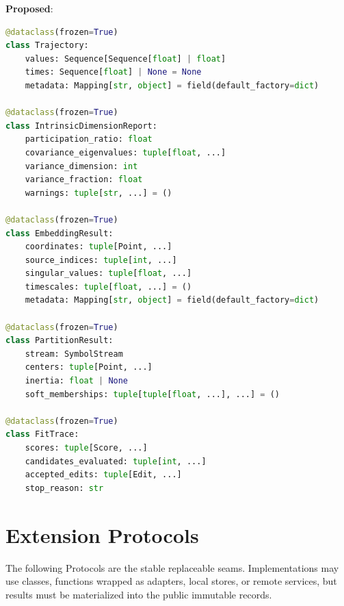 \documentclass[11pt]{article}
\newcommand{\Proposed}{\textbf{Proposed}}
\begin{document}
\Proposed:
\begin{lstlisting}[language=Python]
@dataclass(frozen=True)
class Trajectory:
    values: Sequence[Sequence[float] | float]
    times: Sequence[float] | None = None
    metadata: Mapping[str, object] = field(default_factory=dict)

@dataclass(frozen=True)
class IntrinsicDimensionReport:
    participation_ratio: float
    covariance_eigenvalues: tuple[float, ...]
    variance_dimension: int
    variance_fraction: float
    warnings: tuple[str, ...] = ()

@dataclass(frozen=True)
class EmbeddingResult:
    coordinates: tuple[Point, ...]
    source_indices: tuple[int, ...]
    singular_values: tuple[float, ...]
    timescales: tuple[float, ...] = ()
    metadata: Mapping[str, object] = field(default_factory=dict)

@dataclass(frozen=True)
class PartitionResult:
    stream: SymbolStream
    centers: tuple[Point, ...]
    inertia: float | None
    soft_memberships: tuple[tuple[float, ...], ...] = ()

@dataclass(frozen=True)
class FitTrace:
    scores: tuple[Score, ...]
    candidates_evaluated: tuple[int, ...]
    accepted_edits: tuple[Edit, ...]
    stop_reason: str
\end{lstlisting}

\section{Extension Protocols}

The following Protocols are the stable replaceable seams. Implementations may
use classes, functions wrapped as adapters, local stores, or remote services,
but results must be materialized into the public immutable records.
\end{document}
